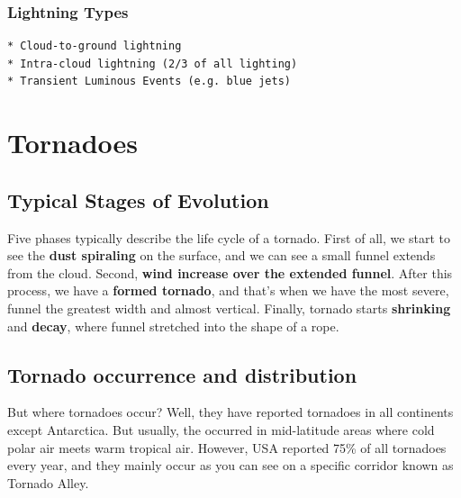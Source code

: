 \documentclass[12pt,oneside]{book}
\begin{document}
\subsubsection{Lightning Types}\label{lightning-types}

\begin{verbatim}
* Cloud-to-ground lightning
* Intra-cloud lightning (2/3 of all lighting)
* Transient Luminous Events (e.g. blue jets)
\end{verbatim}

\section{Tornadoes}\label{tornadoes}

\subsection{Typical Stages of
Evolution}\label{typical-stages-of-evolution}

Five phases typically describe the life cycle of a tornado. First of
all, we start to see the \textbf{dust spiraling} on the surface, and we
can see a small funnel extends from the cloud. Second, \textbf{wind
increase over the extended funnel}. After this process, we have a
\textbf{formed tornado}, and that's when we have the most severe, funnel
the greatest width and almost vertical. Finally, tornado starts
\textbf{shrinking} and \textbf{decay}, where funnel stretched into the
shape of a rope.

\subsection{Tornado occurrence and
distribution}\label{tornado-occurrence-and-distribution}

But where tornadoes occur? Well, they have reported tornadoes in all
continents except Antarctica. But usually, the occurred in mid-latitude
areas where cold polar air meets warm tropical air. However, USA
reported 75\% of all tornadoes every year, and they mainly occur as you
can see on a specific corridor known as Tornado Alley.
\end{document}
